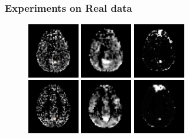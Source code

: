 \documentclass[serif]{beamer}
\begin{document}
\begin{frame}
  \frametitle{Experiments on Real data ~\cite{liu2010spatialCopy} }
  \begin{figure}[bth]
    \centering 
      \includegraphics[width = 0.2\textwidth]{figures/no_overlay/R1_corr_nosmooth}
      \hspace{3pt}
      \includegraphics[width = 0.2\textwidth]{figures/no_overlay/R1_corr_smooth}
      \hspace{3pt}
      \includegraphics[width = 0.2\textwidth]{figures/no_overlay/R1_mrf} \\
      \includegraphics[width = 0.2\textwidth]{figures/no_overlay/R2_corr_nosmooth}
      \hspace{3pt}
      \includegraphics[width = 0.2\textwidth]{figures/no_overlay/R2_corr_smooth}
      \hspace{3pt}
      \includegraphics[width = 0.2\textwidth]{figures/no_overlay/R2_mrf}

\end{figure}
\end{frame}
\end{document}
